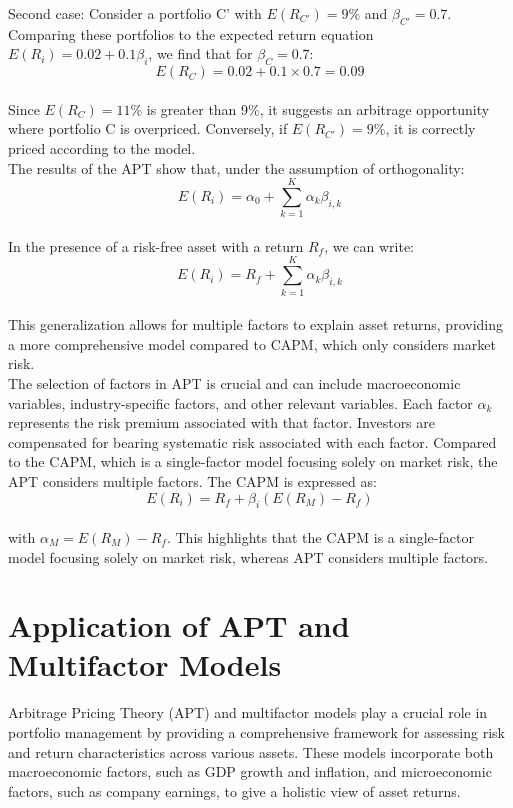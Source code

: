 \documentclass[a4paper,10pt]{article}
\begin{document}
\noindent Second case: Consider a portfolio C' with \(E(R_{C'}) = 9\%\) and \(\beta_{C'} = 0.7\). \\

\noindent Comparing these portfolios to the expected return equation \(E(R_i) = 0.02 + 0.1 \beta_i\), we find that for \(\beta_C = 0.7\): \\
\[E(R_C) = 0.02 + 0.1 \times 0.7 = 0.09\] \\
\noindent Since \(E(R_C) = 11\%\) is greater than 9\%, it suggests an arbitrage opportunity where portfolio C is overpriced. Conversely, if \(E(R_{C'}) = 9\%\), it is correctly priced according to the model. \\

\noindent The results of the APT show that, under the assumption of orthogonality: \[E(R_i) = \alpha_0 + \sum_{k=1}^K \alpha_k \beta_{i,k}\]\\ 
\noident In the presence of a risk-free asset with a return \(R_f\), we can write:\\ \[E(R_i) = R_f + \sum_{k=1}^K \alpha_k \beta_{i,k}\]\\

\noindent This generalization allows for multiple factors to explain asset returns, providing a more comprehensive model compared to CAPM, which only considers market risk. \\

\noindent The selection of factors in APT is crucial and can include macroeconomic variables, industry-specific factors, and other relevant variables. Each factor \(\alpha_k\) represents the risk premium associated with that factor. Investors are compensated for bearing systematic risk associated with each factor. Compared to the CAPM, which is a single-factor model focusing solely on market risk, the APT considers multiple factors. The CAPM is expressed as: \\
\[E(R_i) = R_f + \beta_i (E(R_M) - R_f)\] \\
\noindent with \(\alpha_M = E(R_M) - R_f\). This highlights that the CAPM is a single-factor model focusing solely on market risk, whereas APT considers multiple factors. 

\section*{Application of APT and Multifactor Models}

\noindent Arbitrage Pricing Theory (APT) and multifactor models play a crucial role in portfolio management by providing a comprehensive framework for assessing risk and return characteristics across various assets. These models incorporate both macroeconomic factors, such as GDP growth and inflation, and microeconomic factors, such as company earnings, to give a holistic view of asset returns. 
\end{document}
